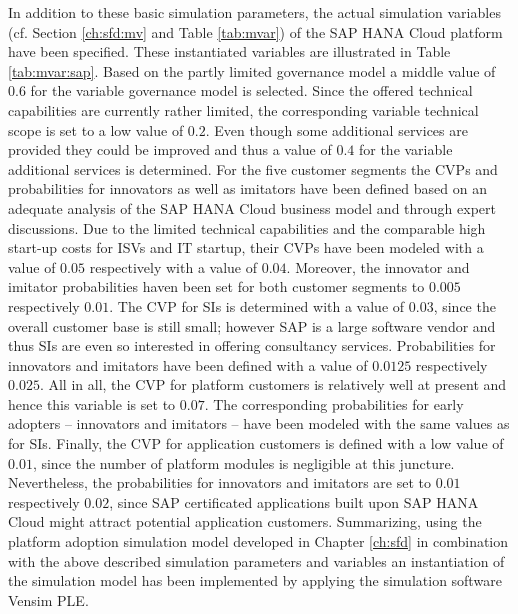 In addition to these basic simulation parameters, the actual simulation variables (cf. Section \ref{ch:sfd:mv} and Table \ref{tab:mvar}) of the SAP HANA Cloud platform have been specified. These instantiated variables are illustrated in Table \ref{tab:mvar:sap}. Based on the partly limited governance model a middle value of $0.6$ for the variable governance model is selected. Since the offered technical capabilities are currently rather limited, the corresponding variable technical scope is set to a low value of $0.2$. Even though some additional services are provided they could be improved and thus a value of $0.4$ for the variable additional services is determined. For the five customer segments the \acp{CVP} and probabilities for innovators as well as imitators have been defined based on an adequate analysis of the SAP HANA Cloud business model and through expert discussions. Due to the limited technical capabilities and the comparable high start-up costs for \acp{ISV} and \ac{IT} startup, their \acp{CVP} have been modeled with a value of $0.05$ respectively with a value of $0.04$. Moreover, the innovator and imitator probabilities haven been set for both customer segments to $0.005$ respectively $0.01$. The \ac{CVP} for \acp{SI} is determined with a value of $0.03$, since the overall customer base is still small; however SAP is a large software vendor and thus \acp{SI} are even so interested in offering consultancy services. Probabilities for innovators and imitators have been defined with a value of $0.0125$ respectively $0.025$. All in all, the \ac{CVP} for platform customers is relatively well at present and hence this variable is set to $0.07$. The corresponding probabilities for early adopters -- innovators and imitators -- have been modeled with the same values as for \acp{SI}. Finally, the \ac{CVP} for application customers is defined with a low value of $0.01$, since the number of platform modules is negligible at this juncture. Nevertheless, the probabilities for innovators and imitators are set to $0.01$ respectively $0.02$, since SAP certificated applications built upon SAP HANA Cloud might attract potential application customers. Summarizing, using the platform adoption simulation model developed in Chapter \ref{ch:sfd} in combination with the above described simulation parameters and variables an instantiation of the simulation model has been implemented by applying the simulation software Vensim \ac{PLE}.


